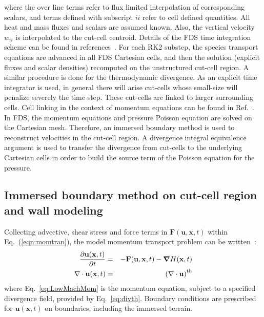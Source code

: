 \documentclass[journal,article,atmosphere,submit,moreauthors,pdftex]{Definitions/mdpi}
\begin{document}
where the over line terms refer to flux limited interpolation of corresponding scalars, and terms defined with subscript $ii$ refer to cell defined quantities. All heat and mass fluxes and scalars are assumed known. Also, the vertical velocity $w_{ii}$ is interpolated to the cut-cell centroid. Details of the FDS time integration scheme can be found in references~\cite{FDS_Users_Guide,mcdermo_2014}. For each RK2 substep, the species transport equations are advanced in all FDS Cartesian cells, and then the solution (explicit fluxes and scalar densities) recomputed on the unstructured cut-cell region. A similar procedure is done for the thermodynamic divergence.
As an explicit time integrator is used, in general there will arise cut-cells whose small-size will penalize severely the time step. These cut-cells are linked to larger surrounding cells. Cell linking in the context of momentum equations can be found in Ref.~\cite{kirk_2003}. In FDS, the momentum equations and pressure Poisson equation are solved on the Cartesian mesh. Therefore, an immersed boundary method is used to reconstruct velocities in the cut-cell region. A divergence integral equivalence argument is used to transfer the divergence from cut-cells to the underlying Cartesian cells in order to build the source term of the Poisson equation for the pressure.


\subsection{Immersed boundary method on cut-cell region and wall modeling}

Collecting advective, shear stress and force terms in $\mathbf{F}(\mathbf{u},\mathbf{x},t)$ within Eq.~(\ref{eqn:momtran}), the model momentum transport problem can be written~\cite{FDS_Users_Guide}:
\begin{eqnarray}
  \frac{\partial \mathbf{u}(\mathbf{x},t)}{\partial t} &=& - \mathbf{F}(\mathbf{u},\mathbf{x},t) - \boldsymbol{\nabla} H(\mathbf{x},t)  \label{eq:LowMachMom} \\
         \nabla \cdot \mathbf{u} (\mathbf{x},t) & = & \left(\nabla \cdot \mathbf{u} \right)^{\rm th} \label{eq:LowMachDiv}
\end{eqnarray}
where Eq.~\eqref{eq:LowMachMom} is the momentum equation, subject to a specified divergence field, provided by Eq.~\eqref{eq:divth}.
Boundary conditions are prescribed for $\mathbf{u}(\mathbf{x},t)$ on boundaries, including the immersed terrain.
\end{document}
